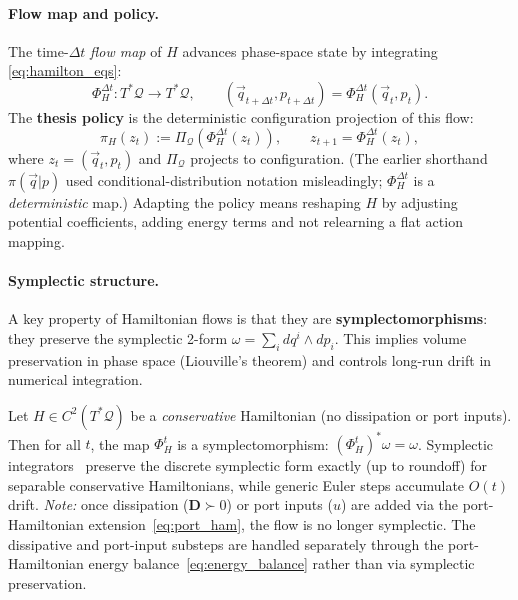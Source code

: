 \paragraph{Flow map and policy.}
The time-$\Delta t$ \emph{flow map} of $H$ advances phase-space state by
integrating \eqref{eq:hamilton_eqs}:
\begin{equation}
  \Phi^{\Delta t}_H : T^*\mathcal{Q} \to T^*\mathcal{Q},
  \qquad
  (\vec{q}_{t+\Delta t}, p_{t+\Delta t})
  = \Phi^{\Delta t}_H(\vec{q}_t, p_t).
  \label{eq:flow_map}
\end{equation}
The \textbf{thesis policy} is the deterministic configuration projection of this flow:
\begin{equation}
  \pi_H(z_t) := \Pi_{\mathcal{Q}}\!\left(\Phi^{\Delta t}_H(z_t)\right),
  \qquad
  z_{t+1} = \Phi^{\Delta t}_H(z_t),
  \label{eq:policy_as_flow}
\end{equation}
where $z_t = (\vec{q}_t, p_t)$ and $\Pi_{\mathcal{Q}}$ projects to configuration.
(The earlier shorthand $\pi(\vec{q}|p)$ used conditional-distribution notation
misleadingly; $\Phi^{\Delta t}_H$ is a \emph{deterministic} map.)
Adapting the policy means reshaping $H$ by adjusting potential coefficients,
adding energy terms and not relearning a flat action mapping.

\paragraph{Symplectic structure.}
A key property of Hamiltonian flows is that they are
\textbf{symplectomorphisms}: they preserve the symplectic 2-form
$\omega = \sum_i dq^i \wedge dp_i$.
This implies volume preservation in phase space (Liouville's theorem) and
controls long-run drift in numerical integration.

\begin{proposition}
\label{prop:symplectic}
Let $H \in C^2(T^*\mathcal{Q})$ be a \emph{conservative} Hamiltonian
(no dissipation or port inputs). Then for all $t$, the map
$\Phi^t_H$ is a symplectomorphism: $(\Phi^t_H)^* \omega = \omega$.
Symplectic integrators~\citep{reich1996symplectic} preserve the discrete
symplectic form exactly (up to roundoff) for separable conservative
Hamiltonians, while generic Euler steps accumulate $O(t)$ drift.
\emph{Note:} once dissipation ($\mathbf{D} \succ 0$) or port inputs ($u$)
are added via the port-Hamiltonian extension~\eqref{eq:port_ham}, the
flow is no longer symplectic.
The dissipative and port-input substeps are handled separately through the
port-Hamiltonian energy balance~\eqref{eq:energy_balance} rather than via
symplectic preservation.
\end{proposition}


